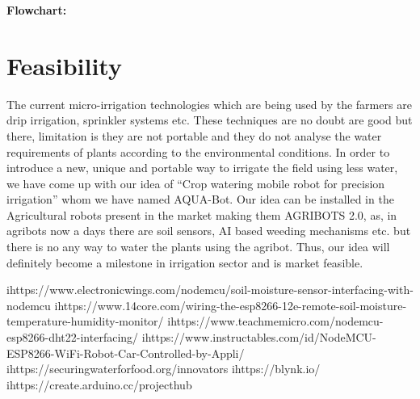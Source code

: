 \documentclass[dvips,12pt]{article}
\begin{document}
\bf Flowchart:
\begin{center}
\end{center}

\section*{Feasibility}
The current micro-irrigation technologies which are being used by the farmers are drip irrigation, sprinkler
systems etc. These techniques are no doubt are good but there, limitation is they are not portable and they do
not analyse the water requirements of plants according to the environmental conditions. In order to introduce
a new, unique and portable way to irrigate the field using less water, we have come up with our idea of
“Crop watering mobile robot for precision irrigation” whom we have named AQUA-Bot. Our idea can be
installed in the Agricultural robots present in the market making them AGRIBOTS 2.0, as, in agribots now a
days there are soil sensors, AI based weeding mechanisms etc. but there is no any way to water the plants
using the agribot. Thus, our idea will definitely become a milestone in irrigation sector and is market
feasible.

 
\begin{thebibliography}{99}

\bibitem ihttps://www.electronicwings.com/nodemcu/soil-moisture-sensor-interfacing-with-nodemcu
\bibitem ihttps://www.14core.com/wiring-the-esp8266-12e-remote-soil-moisture-temperature-humidity-monitor/
\bibitem ihttps://www.teachmemicro.com/nodemcu-esp8266-dht22-interfacing/
\bibitem ihttps://www.instructables.com/id/NodeMCU-ESP8266-WiFi-Robot-Car-Controlled-by-Appli/
\bibitem ihttps://securingwaterforfood.org/innovators
\bibitem ihttps://blynk.io/
\bibitem ihttps://create.arduino.cc/projecthub
\end{thebibliography}
\end{document}
